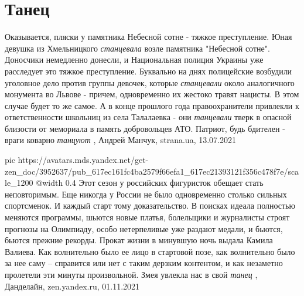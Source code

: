  
 
 
 
 
\chapter{Танец}
\label{sec:slova.tanec}

Оказывается, пляски у памятника Небесной сотне - тяжкое преступление.  Юная
девушка из Хмельницкого \emph{станцевала} возле памятника "Небесной сотне".  Доносчики
немедленно донесли, и Национальная полиция Украины уже расследует это тяжкое
преступление.  Буквально на днях полицейские возбудили уголовное дело против
группы девочек, которые \emph{станцевали} около аналогичного монумента во Львове -
причем, одновременно их жестоко травят нацисты. В этом случае будет то же
самое.  А в конце прошлого года правоохранители привлекли к ответственности
школьниц из села Талалаевка - они \emph{танцевали} тверк в опасной близости от
мемориала в память добровольцев АТО. Патриот, будь бдителен - враги коварно
\emph{танцуют}
, Андрей Манчук, strana.ua, 13.07.2021

\ifcmt
  pic https://avatars.mds.yandex.net/get-zen_doc/3952637/pub_617ec161fc4ba2579f66efa1_617ec21393121f356c478f7e/scale_1200
  @width 0.4
\fi
Этот сезон у российских фигуристок обещает стать неповторимым. Еще никогда у
России не было одновременно столько сильных спортсменок. И каждый старт тому
доказательство. В поисках идеала полностью меняются программы, шьются новые
платья, болельщики и журналисты строят прогнозы на Олимпиаду, особо
нетерпеливые уже раздают медали, и бьются, бьются прежние рекорды.  Прокат
жизни в минувшую ночь выдала Камила Валиева. Как волнительно было ее лицо в
стартовой позе, как волнительно было за нее саму – справится или нет с таким
дерзким контентом, и как незаметно пролетели эти минуты произвольной.  Змея
увлекла нас в свой \emph{танец}
, 
Данделайн, zen.yandex.ru, 01.11.2021
